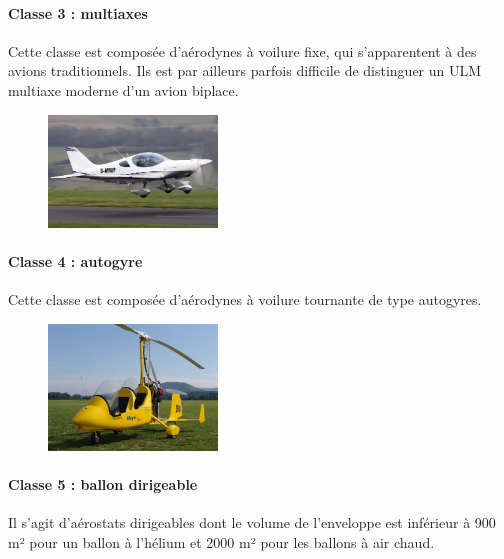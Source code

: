 	\paragraph{Classe 3 : multiaxes}
	Cette classe est composée d'aérodynes à voilure fixe, qui s'apparentent à des avions traditionnels. Ils est par ailleurs parfois difficile de distinguer un ULM  multiaxe moderne d'un avion biplace.
	
	
	\begin{figure}[H]
  	\centering
    \includegraphics[width=0.4\textwidth]{01-EtudeAeronefs/img/ULM_Classe_3.jpg}
	\end{figure}	

	\paragraph{Classe 4 : autogyre}
	Cette classe est composée d'aérodynes à voilure tournante de type autogyres.

	\begin{figure}[H]
  	\centering
    \includegraphics[width=0.4\textwidth]{01-EtudeAeronefs/img/ULM_Classe_4.jpg}
	\end{figure}	
	
	\paragraph{Classe 5 : ballon dirigeable}
	Il s'agit d'aérostats dirigeables dont le volume de l'enveloppe est inférieur à 900 m² pour un  ballon à l'hélium et 2000 m² pour les ballons à air chaud.	
	
